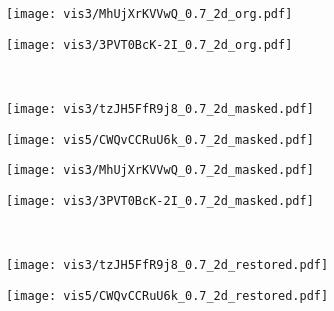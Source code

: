 \documentclass{article}
\begin{document}
\begin{figure}[h]
\begin{subfigure}[b]{0.245\linewidth}
    \end{subfigure}     
    \begin{subfigure}[b]{0.245\linewidth}
        \texttt{[image: vis3/MhUjXrKVVwQ\_0.7\_2d\_org.pdf]}
    \end{subfigure}
    \begin{subfigure}[b]{0.245\linewidth}
        \texttt{[image: vis3/3PVT0BcK-2I\_0.7\_2d\_org.pdf]}
    \end{subfigure}   
    \\
    \begin{subfigure}[b]{0.245\linewidth}
        \texttt{[image: vis3/tzJH5FfR9j8\_0.7\_2d\_masked.pdf]}
    \end{subfigure}    
    \begin{subfigure}[b]{0.245\linewidth}
        \texttt{[image: vis5/CWQvCCRuU6k\_0.7\_2d\_masked.pdf]}
    \end{subfigure}      
    \begin{subfigure}[b]{0.245\linewidth}
        \texttt{[image: vis3/MhUjXrKVVwQ\_0.7\_2d\_masked.pdf]}
    \end{subfigure}
    \begin{subfigure}[b]{0.245\linewidth}
        \texttt{[image: vis3/3PVT0BcK-2I\_0.7\_2d\_masked.pdf]}
    \end{subfigure} 
    \\
    \begin{subfigure}[b]{0.245\linewidth}
        \texttt{[image: vis3/tzJH5FfR9j8\_0.7\_2d\_restored.pdf]}
        \vspace{-0.2em}
\label{fig:vis:e}
    \end{subfigure} 
    \begin{subfigure}[b]{0.245\linewidth}
        \texttt{[image: vis5/CWQvCCRuU6k\_0.7\_2d\_restored.pdf]}
        \vspace{-0.2em}
        \subcaption{
}
\end{subfigure}
\end{figure}
\end{document}
